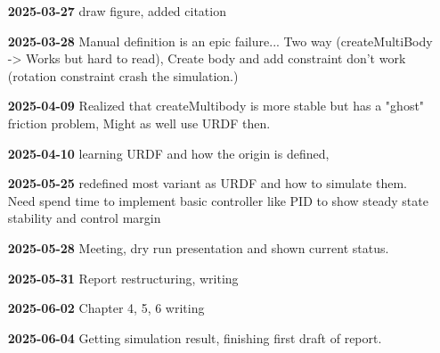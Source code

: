 \begin{itemize}[leftmargin=1.5cm,label={}]
    \item[\textbf{2025-03-27}] draw figure, added citation

    \item[\textbf{2025-03-28}] Manual definition is an epic failure... Two way (createMultiBody -> Works but hard to read), Create body and add constraint don't work (rotation constraint crash the simulation.)

    \item[\textbf{2025-04-09}] Realized that createMultibody is more stable but has a "ghost" friction problem, Might as well use URDF then.

    \item[\textbf{2025-04-10}] learning URDF and how the origin is defined, 

    \item[\textbf{2025-05-25}] redefined most variant as URDF and how to simulate them. Need spend time to implement basic controller like PID to show steady state stability and control margin

    \item[\textbf{2025-05-28}] Meeting, dry run presentation  and shown current status.

    \item[\textbf{2025-05-31}] Report restructuring, writing

    \item[\textbf{2025-06-02}] Chapter 4, 5, 6 writing

    \item[\textbf{2025-06-04}] Getting simulation result, finishing first draft of report.
\end{itemize}
